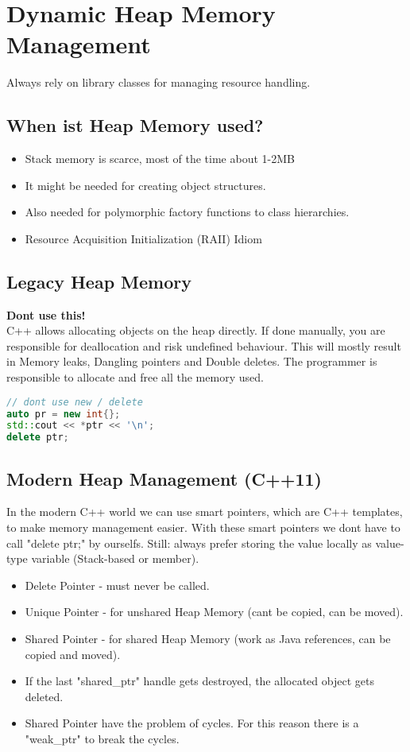 \section{Dynamic Heap Memory Management}
Always rely on library classes for managing resource handling.

\subsection{When ist Heap Memory used?}
\begin{itemize}
  \itemsep -0.5em 
  \item Stack memory is scarce, most of the time about 1-2MB
  \item It might be needed for creating object structures.
  \item Also needed for polymorphic factory functions to class hierarchies.
  \item Resource Acquisition Initialization (RAII) Idiom
\end{itemize}

\subsection{Legacy Heap Memory}
\textbf{Dont use this!}\\
C++ allows allocating objects on the heap directly. If done manually, you are responsible for deallocation and risk undefined behaviour. This will mostly result in Memory leaks, Dangling pointers and Double deletes. The programmer is responsible to allocate and free all the memory used.
\begin{lstlisting}[language=C++]
// dont use new / delete
auto pr = new int{};
std::cout << *ptr << '\n';
delete ptr;
\end{lstlisting}

\subsection{Modern Heap Management (C++11)}
In the modern C++ world we can use smart pointers, which are C++ templates, to make memory management easier. With these smart pointers we dont have to call "delete ptr;" by ourselfs. Still: always prefer storing the value locally as value-type variable (Stack-based or member).
\begin{itemize}
  \itemsep -0.5em 
  \item Delete Pointer - must never be called.
  \item Unique Pointer - for unshared Heap Memory (cant be copied, can be moved).
  \item Shared Pointer - for shared Heap Memory (work as Java references, can be copied and moved).
  \item If the last "shared\_ptr" handle gets destroyed, the allocated object gets deleted.
  \item Shared Pointer have the problem of cycles. For this reason there is a "weak\_ptr" to break the cycles.
\end{itemize}


